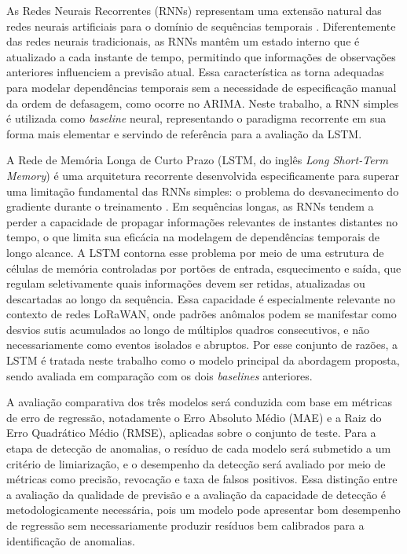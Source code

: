 As Redes Neurais Recorrentes (RNNs) representam uma extensão natural das 
redes neurais artificiais para o domínio de sequências temporais 
\cite{rumelhart1986}. Diferentemente das redes neurais tradicionais, as RNNs 
mantêm um estado interno que é atualizado a cada instante de tempo, 
permitindo que informações de observações anteriores influenciem a previsão 
atual. Essa característica as torna adequadas para modelar dependências 
temporais sem a necessidade de especificação manual da ordem de defasagem, 
como ocorre no ARIMA. Neste trabalho, a RNN simples é utilizada como 
\textit{baseline} neural, representando o paradigma recorrente em sua forma 
mais elementar e servindo de referência para a avaliação da LSTM.

A Rede de Memória Longa de Curto Prazo (LSTM, do inglês 
\textit{Long Short-Term Memory}) é uma arquitetura recorrente desenvolvida 
especificamente para superar uma limitação fundamental das RNNs simples: o 
problema do desvanecimento do gradiente durante o treinamento 
\cite{hochreiter1997}. Em sequências longas, as RNNs tendem a perder a 
capacidade de propagar informações relevantes de instantes distantes no 
tempo, o que limita sua eficácia na modelagem de dependências temporais de 
longo alcance. A LSTM contorna esse problema por meio de uma estrutura de 
células de memória controladas por portões de entrada, esquecimento e saída, 
que regulam seletivamente quais informações devem ser retidas, atualizadas 
ou descartadas ao longo da sequência. Essa capacidade é especialmente 
relevante no contexto de redes LoRaWAN, onde padrões anômalos podem se 
manifestar como desvios sutis acumulados ao longo de múltiplos quadros 
consecutivos, e não necessariamente como eventos isolados e abruptos. Por 
esse conjunto de razões, a LSTM é tratada neste trabalho como o modelo 
principal da abordagem proposta, sendo avaliada em comparação com os dois 
\textit{baselines} anteriores.

A avaliação comparativa dos três modelos será conduzida com base em métricas 
de erro de regressão, notadamente o Erro Absoluto Médio (MAE) e a Raiz do 
Erro Quadrático Médio (RMSE), aplicadas sobre o conjunto de teste. Para a 
etapa de detecção de anomalias, o resíduo de cada modelo será submetido a 
um critério de limiarização, e o desempenho da detecção será avaliado por 
meio de métricas como precisão, revocação e taxa de falsos positivos. Essa 
distinção entre a avaliação da qualidade de previsão e a avaliação da 
capacidade de detecção é metodologicamente necessária, pois um modelo pode 
apresentar bom desempenho de regressão sem necessariamente produzir resíduos 
bem calibrados para a identificação de anomalias.

